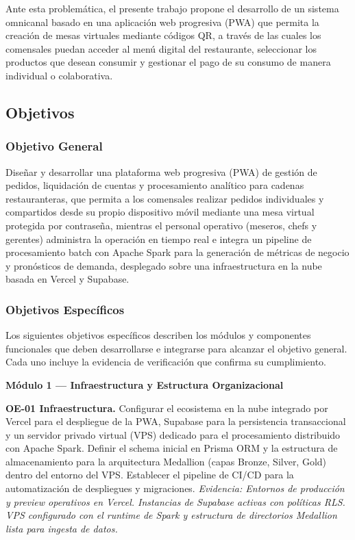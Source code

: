 Ante esta problem\'atica, el presente trabajo propone el desarrollo de un sistema omnicanal
basado en una aplicaci\'on web progresiva (PWA) que permita la creaci\'on de mesas virtuales
mediante c\'odigos QR, a trav\'es de las cuales los comensales puedan acceder al men\'u digital
del restaurante, seleccionar los productos que desean consumir y gestionar el pago de su consumo
de manera individual o colaborativa.

\subsection{Objetivos}

\subsubsection{Objetivo General}

Diseñar y desarrollar una plataforma web progresiva (PWA) de gestión de pedidos,
liquidación de cuentas y procesamiento analítico para cadenas restauranteras,
que permita a los comensales realizar pedidos individuales y compartidos desde
su propio dispositivo móvil mediante una mesa virtual protegida por contraseña,
mientras el personal operativo (meseros, chefs y gerentes) administra la operación
en tiempo real e integra un pipeline de procesamiento batch con Apache Spark
para la generación de métricas de negocio y pronósticos de demanda, desplegado
sobre una infraestructura en la nube basada en Vercel y Supabase.

\subsubsection{Objetivos Específicos}

Los siguientes objetivos específicos describen los módulos y componentes
funcionales que deben desarrollarse e integrarse para alcanzar el objetivo general.
Cada uno incluye la evidencia de verificación que confirma su cumplimiento.

\noindent\textbf{Módulo 1 — Infraestructura y Estructura Organizacional}

\noindent\textbf{OE-01 Infraestructura.}
Configurar el ecosistema en la nube integrado por Vercel para el despliegue de
la PWA, Supabase para la persistencia transaccional y un servidor privado virtual
(VPS) dedicado para el procesamiento distribuido con Apache Spark. Definir el
schema inicial en Prisma ORM y la estructura de almacenamiento para la arquitectura
Medallion (capas Bronze, Silver, Gold) dentro del entorno del VPS. Establecer el
pipeline de CI/CD para la automatización de despliegues y migraciones.
\textit{Evidencia: Entornos de producción y preview operativos en Vercel. Instancias
de Supabase activas con políticas RLS. VPS configurado con el runtime de Spark
y estructura de directorios Medallion lista para ingesta de datos.}

